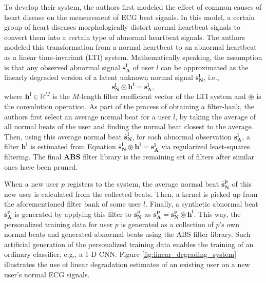 \documentclass[journal,transmag]{IEEEtran}
\begin{document}
To develop their system, the authors first modeled the effect of common causes of heart disease on the measurement of ECG beat signals. In this model, a certain group of heart diseases morphologically distort normal heartbeat signals to convert them into a certain type of abnormal heartbeat signals. The authors modeled this transformation from a normal heartbeat to an abnormal heartbeat as a linear time-invariant (LTI) system. Mathematically speaking, the assumption is that any observed abnormal signal $\bm{s_A^l}$ of user $l$ can be approximated as the linearly degraded version of a latent unknown normal signal $\bm{s_N^l}$, i.e.,
\begin{equation}
    \bm{s_N^l} \circledast \bm{h^l} = \bm{s_A^l},
\end{equation}
where $\bm{h^l} \in \mathbb{R}^M$ is the $M$-length filter coefficient vector of the LTI system and $\circledast$ is the convolution operation. As part of the process of obtaining a filter-bank, the authors first select an average normal beat for a user $l$, by taking the average of all normal beats of the user and finding the normal beat closest to the average. Then, using this average normal beat $\bm{\bar{s}_N^l}$, for each abnormal observation $\bm{s_A^l}$, a filter $\bm{h^l}$ is estimated from Equation $\bm{\bar{s}_N^l} \circledast \bm{h^l} = \bm{s_A^l}$ via regularized least-squares filtering. The final \textbf{ABS} filter library is the remaining set of filters after similar ones have been pruned.

When a new user $p$ registers to the system, the average normal beat $\bm{\bar{s}_N^p}$ of this new user is calculated from the collected beats. Then, a kernel is picked up from the aforementioned filter bank of some user $l$. Finally, a synthetic abnormal beat $\bm{s_A^p}$ is generated by applying this filter to $\bm{\bar{s}_N^p}$ as $\bm{s_A^p} = \bm{\bar{s}_N^p} \circledast \bm{h^l} $. This way, the personalized training data for user $p$ is generated as a collection of $p$'s own normal beats and generated abnormal beats using the ABS filter library. 
Such artificial generation of the  personalized training data enables the training of an ordinary classifier, e.g., a 1-D CNN. Figure \ref{fig:linear_degrading_system} illustrates the use of linear degradation estimates of an existing user on a new user's normal ECG signals.
\end{document}

